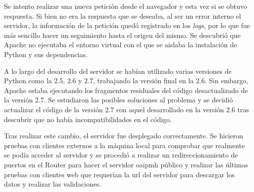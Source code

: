Se intento realizar una nueva petición desde el navegador y esta vez si se obtuvo respuesta. Si bien no era la respuesta que se deseaba, al ser un error interno el servidor, la información de la petición quedó registrado en los \textit{logs}, por lo que fue más sencillo hacer un seguimiento hasta el origen del mismo. Se descubrió que Apache no ejecutaba el entorno virtual con el que se aislaba la instalación de Python y sus dependencias. 

A lo largo del desarrollo del servidor se habían utilizado varias versiones de Python como la 2.5, 2.6 y 2.7, trabajando la versión final en la 2.6. Sin embargo, Apache estaba ejecutando los fragmentos residuales del código desactualizado de la versión 2.7. Se estudiaron las posibles soluciones al problema y se decidió actualizar el código de la versión 2.7 con aquel desarrollado en la versión 2.6 tras descubrir que no había incompatibilidades en el código.

Tras realizar este cambio, el servidor fue desplegado correctamente. Se hicieron pruebas con clientes externos a la máquina local para comprobar que realmente se podía acceder al servidor y se procedió a realizar un redireccionamiento de puertos en el Router para hacer el servidor \acrshort{oaipmh} público y realizar las últimas pruebas con clientes web que requerían la \acrshort{url} del servidor para descargar los datos y realizar las validaciones.
